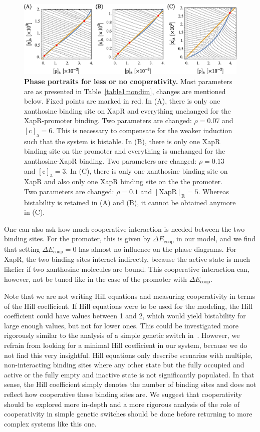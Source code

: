 \documentclass[10pt,letterpaper]{article}
\newcommand{\n}[1]{\mathrm{#1}}
\begin{document}
\begin{figure}%
	\centering
	\includegraphics[width=1\textwidth]{media/FewerSites.eps}
	\caption{{\bf Phase portraits for less or no cooperativity.}
		Most parameters are as presented in Table~\ref{table1:nondim},
		changes are mentioned below. Fixed points are marked in red. In (A),
		there is only one xanthosine binding site on XapR and everything
		unchanged for the XapR-promoter binding. Two parameters are changed:
		$\rho = 0.07$ and $\n{[c]_a} = 6$. This is necessary to compensate
		for the weaker induction such that the system is bistable. In (B),
		there is only one XapR binding site on the promoter and everything
		is unchanged for the xanthosine-XapR binding. Two parameters are
		changed: $\rho = 0.13$ and $\n{[c]_a} = 3$. In (C), there is only
		one xanthosine binding site on XapR and also only one XapR binding
		site on the the promoter. Two parameters are changed: $\rho = 0.1$
		and $\n{[XapR]_R} = 5$. Whereas bistability is retained in (A) and
		(B), it cannot be obtained anymore in (C).}
	\label{fig7:coop}
\end{figure}

One can also ask how much cooperative interaction is needed between the two
binding sites. For the promoter, this is given by $\Delta E_{\n{coop}}$ in
our model, and we find that setting $\Delta E_{\n{coop}} = 0$ has almost no
influence on the phase diagrams. For XapR, the two binding sites interact
indirectly, because the active state is much likelier if two xanthosine
molecules are bound. This cooperative interaction can, however, not be tuned
like in the case of the promoter with $\Delta E_{\n{coop}}$. 

Note that we are not writing Hill equations and measuring cooperativity in
terms of the Hill coefficient. If Hill equations were to be used for the
modeling, the Hill coefficient could have values between 1 and 2, which
would yield bistability for large enough values, but not for lower ones.
This could be investigated more rigorously similar to the analysis of a
simple genetic switch in~\cite{Cherry2000}. However, we refrain from looking
for a minimal Hill coefficient in our system, because we do not find this
very insightful. Hill equations only describe scenarios with multiple,
non-interacting binding sites where any other state but the fully occupied
and active or the fully empty and inactive state is not significantly
populated. In that sense, the Hill coefficient simply denotes the number of
binding sites and does not reflect how cooperative these binding sites are.
We suggest that cooperativity should be explored more in-depth and a more
rigorous analysis of the role of cooperativity in simple genetic switches
should be done before returning to more complex systems like this one.
\end{document}
